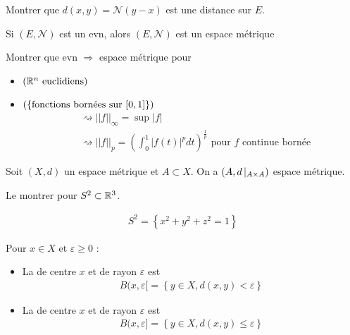\documentclass[french,a4paper,10pt]{article}
\begin{document}
	\begin{exercice}
			Montrer que $d(x,y) = \mathcal{N}(y-x)$ est une distance sur $E$.
	\end{exercice}
	
	\begin{remark}
		Si $(E, \mathcal{N})$ est un evn, alors $(E, \mathcal{N})$ est un espace métrique
	\end{remark}
	
	
	\begin{exercice}
		Montrer que evn $\Longrightarrow$ espace métrique pour
		\begin{itemize}
			\item $(\mathbb{R}^n \text{ euclidiens})$
			\item $(\{\text{fonctions bornées sur }\mathopen{[}0,1\mathclose{]}\})$
			\[\begin{aligned}
				&\rightsquigarrow||f||_\infty = \sup|f|\\
				&\rightsquigarrow||f||_p=\left(\int_0^1|f(t)|^pdt\right)^{\frac1p}\text{ pour }f\text{ continue bornée}
			\end{aligned}\]
		\end{itemize}
	\end{exercice} 
	
	
	\begin{example}
		Soit $(X,d)$ un espace métrique et $A\subset X$. On a $(A, d\mathop{}\!|_{A\times A})$ espace métrique.
	\end{example}
	
	\begin{exercice} 
		Le montrer pour $S^2\subset\mathbb{R}^3$.
	\end{exercice}
	\begin{rappel}
		\[\begin{aligned}
			S^2=\left\{x^2+y^2+z^2 = 1\right\}
		\end{aligned}\]
	\end{rappel}
	
	\begin{definition}
		Pour $x\in X$ et $\varepsilon\ge0$ :
		\begin{itemize}
			\item La  de centre $x$ et de rayon $\varepsilon$ est
			\[\begin{aligned}
				B(x,\varepsilon\mathopen{}[\mathclose{}=\left\{y\in X, d(x,y)<\varepsilon\right\}
			\end{aligned}\]
			\item La  de centre $x$ et de rayon $\varepsilon$ est
			\[\begin{aligned}
				B(x,\varepsilon\mathopen{}]\mathclose{}=\left\{y\in X, d(x,y)\le\varepsilon\right\}
			\end{aligned}\]
		\end{itemize}
	\end{definition}
	
\end{document}
